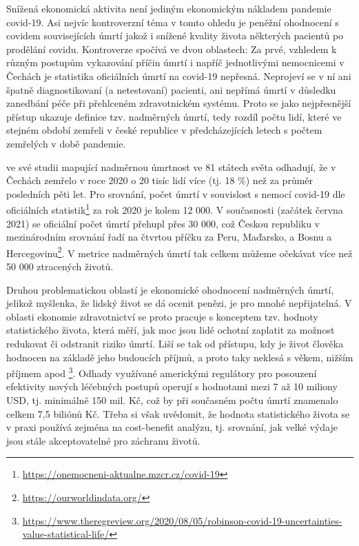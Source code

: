 Snížená ekonomická aktivita není jediným ekonomickým nákladem pandemie covid-19. Asi nejvíc kontroverzní téma v tomto ohledu je peněžní ohodnocení s covidem souvisejících úmrtí jakož i snížené kvality života některých pacientů po prodělání covidu. Kontroverze spočívá ve dvou oblastech: Za prvé, vzhledem k různým postupům vykazování příčin úmrtí i napříč jednotlivými nemocnicemi v Čechách je statistika oficiálních úmrtí na covid-19 nepřesná. Neprojeví se v ní ani špatně diagnostikovaní (a netestovaní) pacienti, ani nepřímá úmrtí v důsledku zanedbání péče při přehlceném zdravotnickém systému. Proto se jako nejpřesnější přístup ukazuje definice tzv. nadměrných úmrtí, tedy rozdíl počtu lidí, které ve stejném období zemřeli v české republice v předcházejících letech s počtem zemřelých v době pandemie. 

\cite{Karlinsky2021} ve své studii mapující nadměrnou úmrtnost ve 81 státech světa odhadují, že v Čechách zemřelo v roce 2020 o 20 tisíc lidí více (tj. 18 \%) než za průměr posledních pěti let. Pro srovnání, počet úmrtí v souvislost s nemocí covid-19 dle oficiálních statistik\footnote{\url{https://onemocneni-aktualne.mzcr.cz/covid-19}} za rok 2020 je kolem 12 000. V současnosti (začátek června 2021) se oficiální počet úmrtí přehupl přes 30 000, což Českou republiku v mezinárodním srovnání řadí na čtvrtou příčku za Peru, Maďarsko, a Bosnu a Hercegovinu\footnote{\url{https://ourworldindata.org/}}. V metrice nadměrných úmrtí tak celkem můžeme očekávat více než 50 000 ztracených životů.

Druhou problematickou oblastí je ekonomické ohodnocení nadměrných úmrtí, jelikož myšlenka, že lidský život se dá ocenit penězi, je pro mnohé nepřijatelná. V oblasti ekonomie zdravotnictví se proto pracuje s konceptem tzv. hodnoty statistického života, která měří, jak moc jsou lidé ochotní zaplatit za možnost redukovat či odstranit riziko úmrtí. Liší se tak od přístupu, kdy je život člověka hodnocen na základě jeho budoucích příjmů, a proto taky neklesá s věkem, nižším příjmem apod \footnote{\url{https://www.theregreview.org/2020/08/05/robinson-covid-19-uncertainties-value-statistical-life/}}. Odhady využívané americkými regulátory pro posouzení efektivity nových léčebných postupů operují s hodnotami mezi 7 až 10 miliony USD, tj. minimálně 150 mil. Kč, což by při současném počtu úmrtí znamenalo celkem 7,5 biliónů Kč. Třeba si však uvědomit, že hodnota statistického života se v praxi používá zejména na cost-benefit analýzu, tj. srovnání, jak velké výdaje jsou stále akceptovatelné pro záchranu životů.


